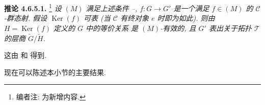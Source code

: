 \medskip
\noindent{}\textbf{推论 4.6.5.1.}
\footnote{编者注:  为新增内容.}
\textit{设 \((M)\) 满足上述条件
--,
\(f:G\to G'\) 是一个满足 \(f\in(M)\) 的 \(\mathscr C\)-群态射.
假设 \(\operatorname{Ker}(f)\) 可表
(当 \(\mathscr C\) 有终对象 \(e\) 时即为如此).
则由 \(H=\operatorname{Ker}(f)\) 定义的 \(G\) 中的等价关系
是 \((M)\)-有效的,
且 \(G'\) 表出关于拓扑 \(\mathcal T\) 的层商
\(\widetilde G/\widetilde H\).}

这由  和
 得到.

现在可以陈述本小节的主要结果.

